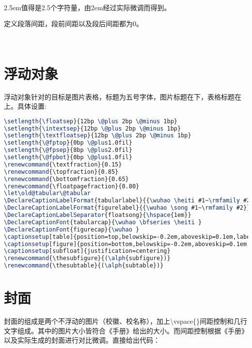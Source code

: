 {\centering {\verb|\setlength{\parindent}{2.5em}|}\\}
2.5em值得是2.5个字符量，由2em经过实际微调而得到。

定义段落间距，段前间距以及段后间距都为0。

{\centering {\verb|\setlength{\parskip}{0bp \@plus .5bp \@minus .5bp}|}\\}

\section{浮动对象}
浮动对象针对的目标是图片表格，标题为五号字体，图片标题在下，表格标题在上。具体设置:
\begin{lstlisting}[language=TeX]
\setlength{\floatsep}{12bp \@plus 2bp \@minus 1bp}
\setlength{\intextsep}{12bp \@plus 2bp \@minus 1bp}
\setlength{\textfloatsep}{12bp \@plus 2bp \@minus 1bp}
\setlength{\@fptop}{0bp \@plus1.0fil}
\setlength{\@fpsep}{8bp \@plus2.0fil}
\setlength{\@fpbot}{0bp \@plus1.0fil}
\renewcommand{\textfraction}{0.15}
\renewcommand{\topfraction}{0.85}
\renewcommand{\bottomfraction}{0.65}
\renewcommand{\floatpagefraction}{0.80}
\let\old@tabular\@tabular
\DeclareCaptionLabelFormat{tabularlabel}{{\wuhao \heiti #1~\rmfamily #2}}
\DeclareCaptionLabelFormat{figurelabel}{{\wuhao \song #1~\rmfamily #2}}
\DeclareCaptionLabelSeparator{floatsong}{\hspace{1em}}
\DeclareCaptionFont{tabularcap}{\wuhao \bfseries \heiti }
\DeclareCaptionFont{figurecap}{\wuhao }
\captionsetup[table]{position=top,belowskip=-0.2em,aboveskip=0.1em,labelformat=tabularlabel,labelsep=floatsong,font=tabularcap}
\captionsetup[figure]{position=bottom,belowskip=-0.2em,aboveskip=0.1em,labelformat=figurelabel,labelsep=floatsong,font=figurecap}
\captionsetup[subfloat]{justification=centering}
\renewcommand{\thesubfigure}{(\alph{subfigure})}
\renewcommand{\thesubtable}{(\alph{subtable})}
\end{lstlisting}

\section{封面}
\label{sec:cover}
封面的组成是两个不浮动的图片（校徽、校名称），加上\textbackslash vspace\{\}间距控制和几行文字组成。其中的图片大小皆符合《手册》给出的大小。而间距控制根据《手册》以及实际生成的封面进行对比微调。直接给出代码：

